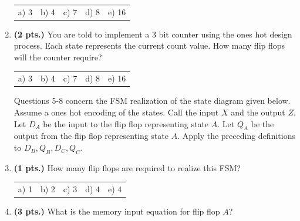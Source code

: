 \documentclass{article}
\begin{document}
\begin{enumerate}
\begin{tabular}{p{0.75in}p{0.75in}p{0.75in}p{0.75in}p{0.75in}}
a) 3 & b) 4 & c) 7 & d) 8 & e) 16 \\
\end{tabular}

\item {\bf (2 pts.)} You are told to implement a 3 bit counter using the
ones hot design process.  Each state represents the current count value. 
How many flip flops will the counter require?

\begin{tabular}{p{0.75in}p{0.75in}p{0.75in}p{0.75in}p{0.75in}}
a) 3 & b) 4 & c) 7 & d) 8 & e) 16 \\
\end{tabular}

\pagebreak
Questions 5-8 concern the FSM realization of the state diagram given below.
Assume a ones hot encoding of the states.  Call the input $X$ and the output 
$Z$.  Let $D_A$ be the input to the flip flop representing state $A$.  Let $Q_A$ 
be the output from the flip flop representing state $A$.  Apply the preceding 
definitions to $D_B, Q_B, D_C, Q_C$.

\item {\bf (1 pts.)} How many flip flops are required to realize this FSM?

\begin{tabular}{p{0.75in}p{0.75in}p{0.75in}p{0.75in}p{0.75in}}
a) 1 & b) 2 & c) 3 & d) 4 & e) 4 \\
\end{tabular}

\item {\bf (3 pts.)} What is the memory input equation for flip flop $A$?


\end{enumerate}
\end{document}
